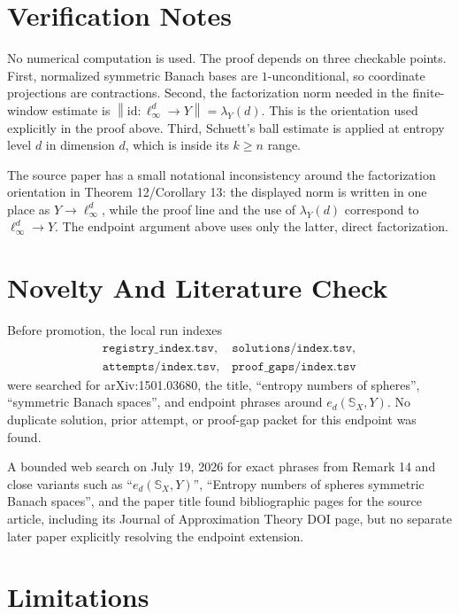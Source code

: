 \documentclass[11pt]{article}
\newcommand{\norm}[1]{\left\lVert #1 \right\rVert}
\newcommand{\id}{\mathrm{id}}
\newcommand{\Sphere}{\mathbb{S}}
\begin{document}
\section*{Verification Notes}

No numerical computation is used.  The proof depends on three checkable points.
First, normalized symmetric Banach bases are \(1\)-unconditional, so coordinate
projections are contractions.  Second, the factorization norm needed in the
finite-window estimate is \(\norm{\id:\ell_\infty^d\to Y}=\lambda_Y(d)\).
This is the orientation used explicitly in the proof above.  Third, Schuett's
ball estimate is applied at entropy level \(d\) in dimension \(d\), which is
inside its \(k\ge n\) range.

The source paper has a small notational inconsistency around the factorization
orientation in Theorem 12/Corollary 13: the displayed norm is written in one
place as \(Y\to\ell_\infty^d\), while the proof line and the use of
\(\lambda_Y(d)\) correspond to \(\ell_\infty^d\to Y\).  The endpoint argument
above uses only the latter, direct factorization.

\section*{Novelty And Literature Check}

Before promotion, the local run indexes
\[
\begin{gathered}
\texttt{registry\_index.tsv},\quad
\texttt{solutions/index.tsv},\\
\texttt{attempts/index.tsv},\quad
\texttt{proof\_gaps/index.tsv}
\end{gathered}
\]
were searched for arXiv:1501.03680, the title, ``entropy numbers of spheres'',
``symmetric Banach spaces'', and endpoint phrases around \(e_d(\Sphere_X,Y)\).
No duplicate solution, prior attempt, or proof-gap packet for this endpoint was
found.

A bounded web search on July 19, 2026 for exact phrases from Remark 14 and
close variants such as ``\(e_d(\Sphere_X,Y)\)'', ``Entropy numbers of spheres
symmetric Banach spaces'', and the paper title found bibliographic pages for
the source article, including its Journal of Approximation Theory DOI page, but
no separate later paper explicitly resolving the endpoint extension.

\section*{Limitations}
\end{document}
